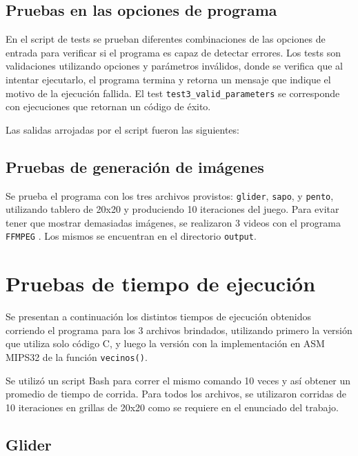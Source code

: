 \documentclass[a4paper,12pt]{article}
\numberwithin{equation}{section}
\numberwithin{figure}{section}
\begin{document}
	
	\subsection{Pruebas en las opciones de programa}
	
	En el script de tests se prueban diferentes combinaciones de las opciones de entrada para verificar si el programa es capaz de detectar errores. Los tests son validaciones utilizando opciones y parámetros inválidos, donde se verifica que al intentar ejecutarlo, el programa termina y retorna un mensaje que indique el motivo de la ejecución fallida. El test \texttt{test3\_valid\_parameters} se corresponde con ejecuciones que retornan un código de éxito. 
	
	Las salidas arrojadas por el script fueron las siguientes:
	
	
	
	\clearpage
	\subsection{Pruebas de generación de imágenes}
	
	Se prueba el programa con los tres archivos provistos: \texttt{glider}, \texttt{sapo}, y \texttt{pento}, utilizando tablero de 20x20 y produciendo 10 iteraciones del juego. Para evitar tener que mostrar demasiadas imágenes, se realizaron 3 videos con el programa \texttt{FFMPEG} \cite{tool_ffmpeg}. Los mismos se encuentran en el directorio \texttt{output}.
	
	\section{Pruebas de tiempo de ejecución}
	
	Se presentan a continuación los distintos tiempos de ejecución obtenidos corriendo el programa para los 3 archivos brindados, utilizando primero la versión que utiliza solo código C, y luego la versión con la implementación en ASM MIPS32 de la función \texttt{vecinos()}.
	
	Se utilizó un script Bash para correr el mismo comando 10 veces y así obtener un promedio de tiempo de corrida. Para todos los archivos, se utilizaron corridas de 10 iteraciones en grillas de 20x20 como se requiere en el enunciado del trabajo.
	
	\subsection{Glider}
	
\end{document}
